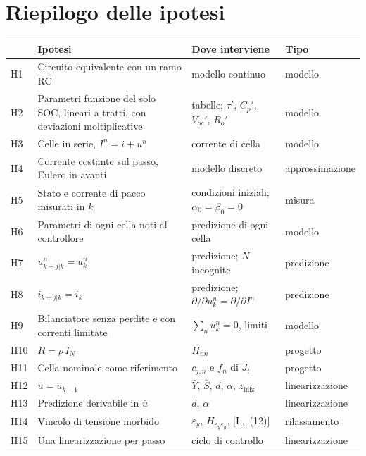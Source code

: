 \documentclass[11pt,a4paper]{article}
\begin{document}
\section{Riepilogo delle ipotesi}\label{sec:riepilogo}

\begin{center}
\small
\begin{tabular}{@{}l >{\raggedright\arraybackslash}p{6.4cm}
                   >{\raggedright\arraybackslash}p{4.4cm} l@{}}
\toprule
 & Ipotesi & Dove interviene & Tipo \\
\midrule
H1  & Circuito equivalente con un ramo RC & modello continuo & modello \\
H2  & Parametri funzione del solo SOC, lineari a tratti, con deviazioni
      moltiplicative & tabelle; $\tau'$, $C_p'$, $V_{oc}'$, $R_o'$ & modello \\
H3  & Celle in serie, $I^n = i + u^n$ & corrente di cella & modello \\
H4  & Corrente costante sul passo, Eulero in avanti & modello discreto &
      approssimazione \\
H5  & Stato e corrente di pacco misurati in $k$ & condizioni iniziali;
      \mbox{$\alpha_0 = \beta_0 = 0$} & misura \\
H6  & Parametri di ogni cella noti al controllore & predizione di ogni cella
      & modello \\
H7  & $u^n_{k+j|k} = u^n_k$ & predizione; $N$ incognite & predizione \\
H8  & $i_{k+j|k} = i_k$ & predizione; $\partial/\partial u^n_k =
      \partial/\partial I^n$ & predizione \\
H9  & Bilanciatore senza perdite e con correnti limitate &
      $\sum_n u^n_k = 0$, limiti & modello \\
H10 & $R = \rho\, I_N$ & $H_{nn}$ & progetto \\
H11 & Cella nominale come riferimento & $c_{j,n}$ e $f_n$ di $J_t$ &
      progetto \\
H12 & $\bar u = u_{k-1}$ & $\bar Y$, $\bar S$, $d$, $\alpha$, $z_{\mathrm{iniz}}$ &
      linearizzazione \\
H13 & Predizione derivabile in $\bar u$ & $d$, $\alpha$ & linearizzazione \\
H14 & Vincolo di tensione morbido & $\varepsilon_y$, $H_{\varepsilon_y\varepsilon_y}$, [L,~(12)] &
      rilassamento \\
H15 & Una linearizzazione per passo & ciclo di controllo &
      linearizzazione \\
\bottomrule
\end{tabular}
\end{center}
\end{document}
